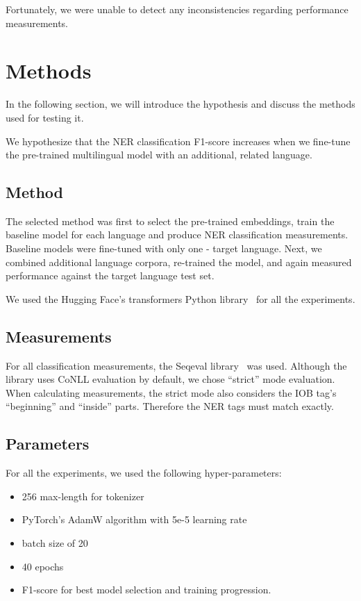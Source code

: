 \documentclass[sigconf]{acmart}
\newcommand{\mpu}[1]{\hl{\textbf{MP:} #1}}
\begin{document}
Fortunately, we were unable to detect any inconsistencies regarding performance measurements.

\section{Methods}
\label{sec:methods}
In the following section, we will introduce the hypothesis and discuss the methods used for testing it.

We hypothesize that the NER classification F1-score increases when we fine-tune the pre-trained multilingual model with an additional, related language.

\subsection{Method}
\label{subsec:method}
The selected method was first to select the pre-trained embeddings, train the baseline model for each language and produce NER classification measurements.
Baseline models were fine-tuned with only one - target language.
Next, we combined additional language corpora, re-trained the model, and again measured performance against the target language test set.

We used the Hugging Face's transformers Python library~\cite{wolf-etal-2020-transformers} for all the experiments.

\subsection{Measurements}
\label{subsec:measurements}
For all classification measurements, the Seqeval library~\cite{seqeval} was used.
Although the library uses CoNLL evaluation by default, we chose ``strict'' mode evaluation.
When calculating measurements, the strict mode also considers the IOB tag's ``beginning'' and ``inside'' parts.
Therefore the NER tags must match exactly.

\subsection{Parameters}
\label{subsec:parameters}
For all the experiments, we used the following hyper-parameters:
\begin{itemize}
  \item 256 max-length for tokenizer
  \item PyTorch's AdamW algorithm with 5e-5 learning rate
  \item batch size of 20
  \item 40 epochs
  \item F1-score for best model selection and training progression.
\end{itemize}
\end{document}
